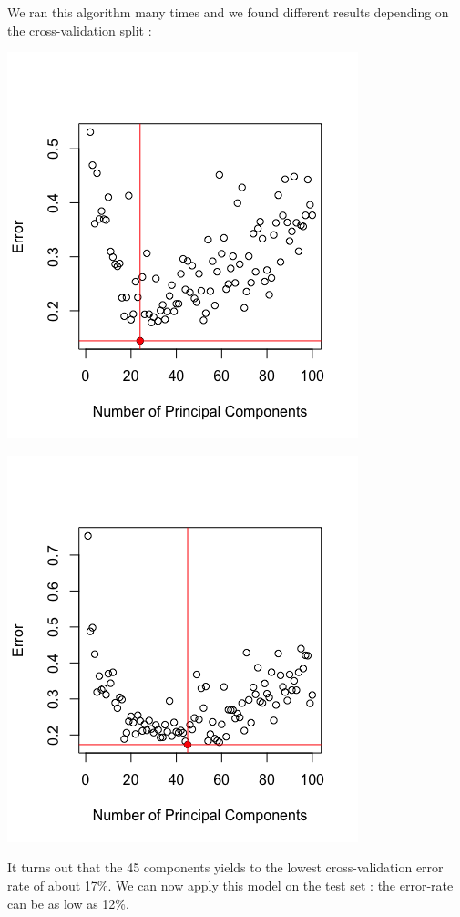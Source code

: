 \documentclass[]{report}
\begin{document}
We ran this algorithm many times and we found different results depending on the cross-validation split : 

\begin{center}
	\includegraphics[width=0.6\linewidth]{Figures/lda_pca_cv.png}
	\label{fig:lda_pca_cv}
\end{center}

\begin{center}
	\includegraphics[width=0.6\linewidth]{Figures/lda_pca_cv_2.png}
	\label{fig:lda_pca_cv_2}
\end{center}

It turns out that the 45 components yields to the lowest cross-validation error rate of about 17\%. We can now apply this model on the test set : the error-rate can be as low as 12\%.
\end{document}
